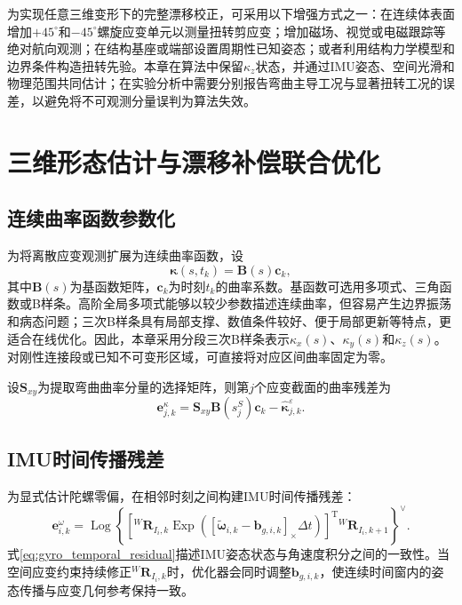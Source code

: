为实现任意三维变形下的完整漂移校正，可采用以下增强方式之一：在连续体表面增加$+45^{\circ}$和$-45^{\circ}$螺旋应变单元以测量扭转剪应变；增加磁场、视觉或电磁跟踪等绝对航向观测；在结构基座或端部设置周期性已知姿态；或者利用结构力学模型和边界条件构造扭转先验。本章在算法中保留$\kappa_z$状态，并通过IMU姿态、空间光滑和物理范围共同估计；在实验分析中需要分别报告弯曲主导工况与显著扭转工况的误差，以避免将不可观测分量误判为算法失效。

\section{三维形态估计与漂移补偿联合优化}
\label{sec:joint_optimization}

\subsection{连续曲率函数参数化}

为将离散应变观测扩展为连续曲率函数，设
\begin{equation}
    \bm\kappa(s,t_k)
    =\bm B(s)\bm c_k,
    \label{eq:curvature_basis}
\end{equation}
其中$\bm B(s)$为基函数矩阵，$\bm c_k$为时刻$t_k$的曲率系数。基函数可选用多项式、三角函数或B样条。高阶全局多项式能够以较少参数描述连续曲率，但容易产生边界振荡和病态问题；三次B样条具有局部支撑、数值条件较好、便于局部更新等特点，更适合在线优化。因此，本章采用分段三次B样条表示$\kappa_x(s)$、$\kappa_y(s)$和$\kappa_z(s)$。对刚性连接段或已知不可变形区域，可直接将对应区间曲率固定为零。

设$\bm S_{xy}$为提取弯曲曲率分量的选择矩阵，则第$j$个应变截面的曲率残差为
\begin{equation}
    \bm e_{j,k}^{\kappa}
    =\bm S_{xy}\bm B(s_j^S)\bm c_k
    -\hat{\bm\kappa}_{j,k}^{\varepsilon}.
    \label{eq:curvature_residual}
\end{equation}

\subsection{IMU时间传播残差}

为显式估计陀螺零偏，在相邻时刻之间构建IMU时间传播残差：
\begin{equation}
    \bm e_{i,k}^{\omega}
    =\operatorname{Log}\left
    \{
    \left[
    {}^{W}\bm R_{I_i,k}
    \operatorname{Exp}
    \left(
    [\tilde{\bm\omega}_{i,k}-\bm b_{g,i,k}]_{\times}\Delta t
    \right)
    \right]^{\mathrm T}
    {}^{W}\bm R_{I_i,k+1}
    \right\}^{\vee}.
    \label{eq:gyro_temporal_residual}
\end{equation}
式\eqref{eq:gyro_temporal_residual}描述IMU姿态状态与角速度积分之间的一致性。当空间应变约束持续修正${}^{W}\bm R_{I_i,k}$时，优化器会同时调整$\bm b_{g,i,k}$，使连续时间窗内的姿态传播与应变几何参考保持一致。

